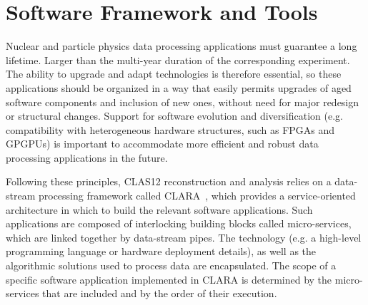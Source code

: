\section{Software Framework and Tools}
\label{sec:framework}


Nuclear and particle physics data processing applications must guarantee a long lifetime.  Larger than the multi-year
duration of the corresponding experiment. The ability to upgrade and adapt technologies is therefore essential, so
these applications should be organized in a way that easily permits upgrades of aged software components and
inclusion of new ones, without need for major redesign or structural changes.  Support for software evolution and
diversification (e.g. compatibility with heterogeneous hardware structures, such as FPGAs and GPGPUs) is important
to accommodate more efficient and robust data processing applications in the future.

Following these principles, CLAS12 reconstruction and analysis relies on a data-stream processing framework called
CLARA~\cite{clara-2011,clara-service,framework,clara-2016}, which provides a service-oriented architecture in which
to build the relevant software applications.  Such applications are composed of interlocking building blocks called
micro-services, which are linked together by data-stream pipes.  The technology (e.g. a high-level programming
language or hardware deployment details), as well as the algorithmic solutions used to process data are encapsulated. The scope of a specific software application implemented in CLARA is determined
by the micro-services that are included and by the order of their execution.


